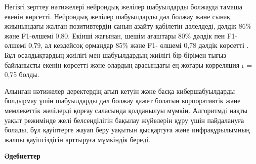 \begin{multicols}{2}
Негізгі зерттеу нәтижелері нейрондық желілер шабуылдарды болжауда тамаша
екенін көрсетті. Нейрондық желілер шабуылдарды дәл болжау және сынақ
жиынындағы жалған позитивтердің санын азайту қабілетін дәлелдеді, дәлдік
86\% және F1-өлшемі 0,80. Екінші жағынан, шешім ағаштары 80\% дәлдік пен
F1-өлшемі 0,79, ал кездейсоқ ормандар 85\% және F1- өлшемі 0,78 дәлдік
көрсетті . Бұл осалдықтардың жиілігі мен шабуылдардың жиілігі
бір-бірімен тығыз байланысты екенін көрсетті және олардың арасындағы ең
жоғары корреляция r = 0,75 болды.

Алынған нәтижелер деректердің ағып кетуін және басқа кибершабуылдарды
болдырмау үшін шабуылдарды дәл болжау қажет болатын корпоративтік және
мемлекеттік желілерді қорғау саласында қолданылуы мүмкін. Алгоритмді
нақты уақыт режимінде желі белсенділігін бақылау жүйелерін құру үшін
пайдалануға болады, бұл қауіптерге жауап беру уақытын қысқартуға және
инфрақұрылымның жалпы қауіпсіздігін арттыруға мүмкіндік береді.
\end{multicols}

\begin{center}
{\bfseries Әдебиеттер}
\end{center}

